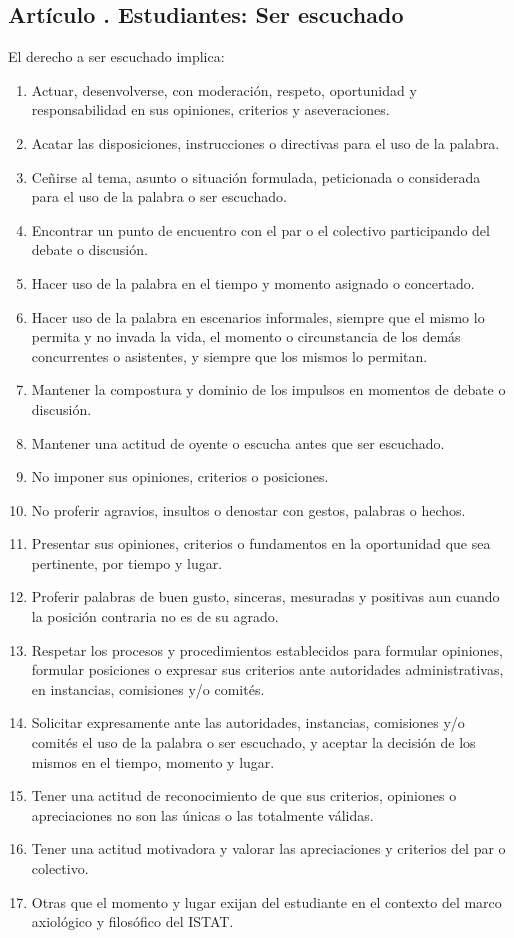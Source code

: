 \subsection{Artículo . Estudiantes: Ser escuchado}
\addtocounter{ns}{1}
El derecho a ser escuchado implica: 
\begin{enumerate}
\item Actuar, desenvolverse, con moderación, respeto, oportunidad y responsabilidad en sus opiniones, criterios y aseveraciones. 
\item Acatar las disposiciones, instrucciones o directivas para el uso de la palabra. 
\item Ceñirse al tema, asunto o situación formulada, peticionada o considerada para el uso de la palabra o ser escuchado. 
\item Encontrar un punto de encuentro con el par o el colectivo participando del debate o discusión. 
\item Hacer uso de la palabra en el tiempo y momento asignado o concertado. 
\item Hacer uso de la palabra en escenarios informales, siempre que el mismo lo permita y no invada la vida, el momento o circunstancia de los demás concurrentes o asistentes, y siempre que los mismos lo permitan. 
\item Mantener la compostura y dominio de los impulsos en momentos de debate o discusión. 
\item Mantener una actitud de oyente o escucha antes que ser escuchado. 
\item No imponer sus opiniones, criterios o posiciones. 
\item No proferir agravios, insultos o denostar con gestos, palabras o hechos. 
\item Presentar sus opiniones, criterios o fundamentos en la oportunidad que sea pertinente, por tiempo y lugar. 
\item Proferir palabras de buen gusto, sinceras, mesuradas y positivas aun cuando la posición contraria no es de su agrado. 
\item Respetar los procesos y procedimientos establecidos para formular opiniones, formular posiciones o expresar sus criterios ante autoridades administrativas, en instancias, comisiones y/o comités. 
\item Solicitar expresamente ante las autoridades, instancias, comisiones y/o comités el uso de la palabra o ser escuchado, y aceptar la decisión de los mismos en el tiempo, momento y lugar. 
\item Tener una actitud de reconocimiento de que sus criterios, opiniones o apreciaciones no son las únicas o las totalmente válidas. 
\item Tener una actitud motivadora y valorar las apreciaciones y criterios del par o colectivo. 
\item Otras que el momento y lugar exijan del estudiante en el contexto del marco axiológico y filosófico del ISTAT.  
\end{enumerate}
